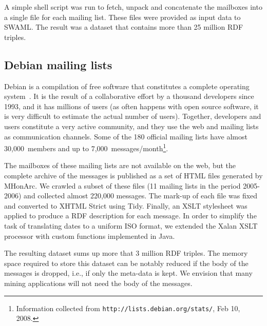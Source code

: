 \documentclass{../templates/www2008-submission}
\begin{document}
A simple shell script was run to fetch, unpack and concatenate the
mailboxes into a single file for each mailing list. These files
were provided as input data to SWAML. The
result was a dataset that contains more than 25 million RDF triples.

\subsection{Debian mailing lists}\label{sec:debian}

Debian is a compilation of free software that constitutes a
complete operating system~\cite{Krafft2005}. It is the result of a
collaborative effort by a thousand developers since 1993, and it has
millions of users (as often happens with open source software, it is very
difficult to estimate the actual number of users). Together, developers
and users constitute a very active community, and they use the web and
mailing lists as communication channels. Some of the 180 official mailing
lists have almost 30,000~members and up to
7,000~messages/month\footnote{Information collected from \texttt{http://lists.debian.org/stats/}, Feb 10, 2008.}.

The mailboxes of these mailing lists are not available on the web, but
the complete archive of the messages is published as a set of
HTML files generated by MHonArc. We crawled a subset of these files
(11 mailing lists in the period 2005-2006) and collected almost 220,000
messages. The mark-up of each file was fixed and converted to XHTML Strict
using Tidy. Finally, an XSLT stylesheet was applied to produce a
RDF description for each message. In order to simplify the
task of translating dates to a uniform ISO format, we extended
the Xalan XSLT processor with custom functions implemented in Java.

The resulting dataset sums up more that 3 million RDF triples. The
memory space required to store this dataset can be notably
reduced if the body of the messages is dropped, i.e., if only the meta-data
is kept. We envision that many mining applications will not need the
body of the messages.

%
%
\end{document}
